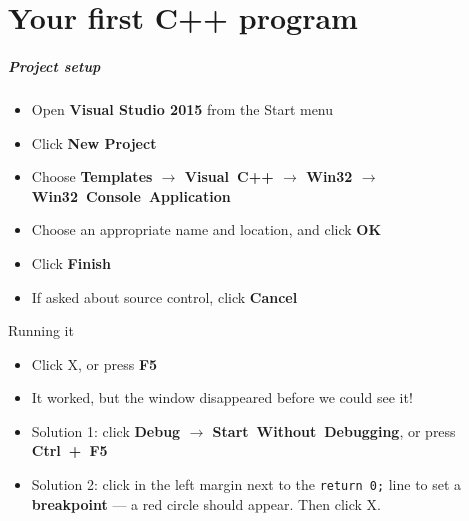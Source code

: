 \part{Your first C++ program}
\frame{\partpage}

\begin{frame}
	\frametitle{Project setup}
	\begin{itemize}
		\item Open \textbf{Visual Studio 2015} from the Start menu
		\item Click \textbf{New Project}
		\item Choose \textbf{Templates $\to$ Visual~C++ $\to$ Win32 $\to$ Win32~Console~Application}
		\item Choose an appropriate name and location, and click \textbf{OK}
		\item Click \textbf{Finish}
		\item If asked about source control, click \textbf{Cancel}
	\end{itemize}
\end{frame}

\begin{frame}{Running it}
	\begin{itemize}
		\item Click X, or press \textbf{F5} \pause
		\item It worked, but the window disappeared before we could see it! \pause
		\item Solution 1: click \textbf{Debug $\to$ Start~Without~Debugging}, or press \textbf{Ctrl~+~F5}
		\item Solution 2: click in the left margin next to the \lstinline{return 0;} line to set a \textbf{breakpoint} ---
			a red circle should appear. Then click X.
	\end{itemize}
\end{frame}
